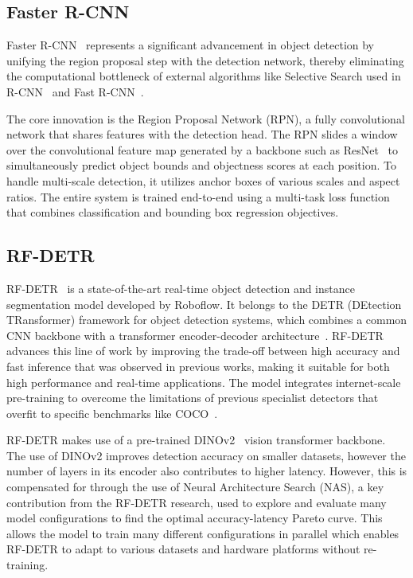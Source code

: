 \documentclass{article}
\begin{document}
\subsection{Faster R-CNN}
Faster R-CNN~\cite{fasterrcnn} represents a significant advancement in object detection by unifying the region proposal step with the detection network, thereby eliminating the computational bottleneck of external algorithms like Selective Search used in R-CNN~\cite{rcnn} and Fast R-CNN~\cite{fastrcnn}.

The core innovation is the Region Proposal Network (RPN), a fully convolutional network that shares features with the detection head. The RPN slides a window over the convolutional feature map generated by a backbone such as ResNet~\cite{resnet} to simultaneously predict object bounds and objectness scores at each position. To handle multi-scale detection, it utilizes anchor boxes of various scales and aspect ratios. The entire system is trained end-to-end using a multi-task loss function that combines classification and bounding box regression objectives.

\subsection{RF-DETR}

RF-DETR~\cite{rf-detr} is a state-of-the-art real-time object detection and instance segmentation model developed by Roboflow. It belongs to the DETR (DEtection TRansformer) framework for object detection systems, which combines a common CNN backbone with a transformer encoder-decoder architecture~\cite{detr}. RF-DETR advances this line of work by improving the trade-off between high accuracy and fast inference that was observed in previous works, making it suitable for both high performance and real-time applications. The model integrates internet-scale pre-training to overcome the limitations of previous specialist detectors that overfit to specific benchmarks like COCO~\cite{rf-detr}.

RF-DETR makes use of a pre-trained DINOv2~\cite{dinov2} vision transformer backbone. The use of DINOv2 improves detection accuracy on smaller datasets, however the number of layers in its encoder also contributes to higher latency. However, this is compensated for through the use of Neural Architecture Search (NAS), a key contribution from the RF-DETR research, used to explore and evaluate many model configurations to find the optimal accuracy-latency Pareto curve. This allows the model to train many different configurations in parallel which enables RF-DETR to adapt to various datasets and hardware platforms without re-training.
\end{document}

